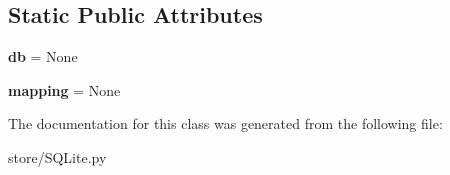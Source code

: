 \subsection*{Static Public Attributes}
\begin{DoxyCompactItemize}
\item 
\hypertarget{classstore_1_1_s_q_lite_1_1_s_q_lite_store_af2dc2bebd36e08bd004a7c5d2f60282b}{{\bfseries db} = None}\label{classstore_1_1_s_q_lite_1_1_s_q_lite_store_af2dc2bebd36e08bd004a7c5d2f60282b}

\item 
\hypertarget{classstore_1_1_s_q_lite_1_1_s_q_lite_store_a5099a320cc0adc3d76f474e7d8771088}{{\bfseries mapping} = None}\label{classstore_1_1_s_q_lite_1_1_s_q_lite_store_a5099a320cc0adc3d76f474e7d8771088}

\end{DoxyCompactItemize}


The documentation for this class was generated from the following file\-:\begin{DoxyCompactItemize}
\item 
store/S\-Q\-Lite.\-py\end{DoxyCompactItemize}
